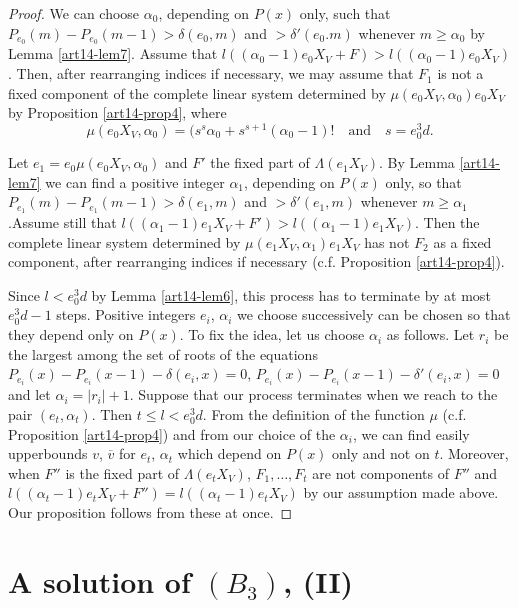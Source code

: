 \begin{proof}
We can choose $\alpha_{0}$, depending on $P(x)$ only, such that $P_{e_{0}}(m)-P_{e_{0}}(m-1)>\delta (e_{0},m)$ and $>\delta'(e_{0}.m)$ whenever $m\geq \alpha_{0}$ by Lemma \ref{art14-lem7}. Assume that $l((\alpha_{0}-1)e_{0}X_{V}+F)>l((\alpha_{0}-1)e_{0}X_{V})$. Then, after rearranging indices if necessary, we may assume that $F_{1}$ is not a fixed component of the complete linear system determined by $\mu(e_{0}X_{V},\alpha_{0})e_{0}X_{V}$ by Proposition \ref{art14-prop4}, where
$$
\mu (e_{0}X_{V}, \alpha_{0})=(s^{s}\alpha_{0}+s^{s+1}(\alpha_{0}-1)!\text{~~ and~~ } s=e^{3}_{0}d.
$$

Let $e_{1}=e_{0}\mu(e_{0}X_{V},\alpha_{0})$ and $F'$ the fixed part of $\Lambda (e_{1}X_{V})$. By Lemma \ref{art14-lem7} we can find a positive integer $\alpha_{1}$, depending on $P(x)$ only, so that $P_{e_{1}}(m)-P_{e_{1}}(m-1)>\delta (e_{1},m)$ and $>\delta'(e_{1},m)$ whenever $m\geq \alpha_{1}$.\pageoriginale Assume still that $l((\alpha_{1}-1)e_{1}X_{V}+F')>l((\alpha_{1}-1)e_{1}X_{V})$. Then the complete linear system determined by $\mu(e_{1}X_{V},\alpha_{1})e_{1}X_{V}$ has not $F_{2}$ as a fixed component, after rearranging indices if necessary (c.f. Proposition \ref{art14-prop4}).

Since $l<e^{3}_{0}d$ by Lemma \ref{art14-lem6}, this process has to terminate by at most $e^{3}_{0}d-1$ steps. Positive integers $e_{i}$, $\alpha_{i}$ we choose successively can be chosen so that they depend only on $P(x)$. To fix the idea, let us choose $\alpha_{i}$ as follows. Let $r_{i}$ be the largest among the set of roots of the equations $P_{e_{i}}(x)-P_{e_{i}}(x-1)-\delta (e_{i},x)=0$, $P_{e_{i}}(x)-P_{e_{i}}(x-1)-\delta'(e_{i},x)=0$ and let $\alpha_{i}=|r_{i}|+1$. Suppose that our process terminates when we reach to the pair $(e_{t},\alpha_{t})$. Then $t\leq l<e^{3}_{0}d$. From the definition of the function $\mu$ (c.f. Proposition \ref{art14-prop4}) and from our choice of the $\alpha_{i}$, we can find easily upperbounds $v$, $\overline{v}$ for $e_{t}$, $\alpha_{t}$ which depend on $P(x)$ only and not on $t$. Moreover, when $F''$ is the fixed part of $\Lambda(e_{t}X_{V})$, $F_{1},\ldots,F_{t}$ are not components of $F''$ and $l((\alpha_{t}-1)e_{t}X_{V}+F'')=l((\alpha_{t}-1)e_{t}X_{V})$ by our assumption made above. Our proposition follows from these at once.
\end{proof}

\section{A solution of \texorpdfstring{$(B_{3})$}{B3}, (II)}\label{art14-sec6}

